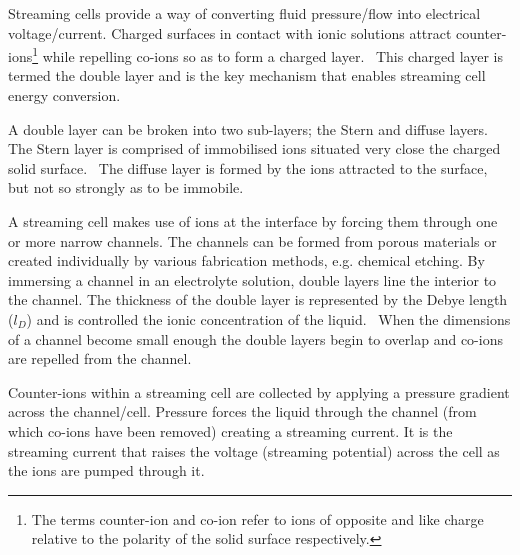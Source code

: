 \documentclass[10pt,final,journal]{IEEEtran}
\begin{document}
    Streaming cells provide a way of converting fluid pressure/flow into electrical voltage/current.
    Charged surfaces in contact with ionic solutions attract counter-ions\footnote{The terms counter-ion and co-ion refer to ions of opposite and like charge relative to the polarity of the solid surface respectively.} while repelling co-ions so as to form a charged layer.~\cite{Stein2004}
    This charged layer is termed the double layer and is the key mechanism that enables streaming cell energy conversion.

    A double layer can be broken into two sub-layers; the Stern and diffuse layers.
    The Stern layer is comprised of immobilised ions situated very close the charged solid surface.~\cite{Salieb-Beugelaar2009}
    The diffuse layer is formed by the ions attracted to the surface, but not so strongly as to be immobile.

    A streaming cell makes use of ions at the interface by forcing them through one or more narrow channels.
    The channels can be formed from porous materials or created individually by various fabrication methods, e.g. chemical etching.
    By immersing a channel in an electrolyte solution, double layers line the interior to the channel.
    The thickness of the double layer is represented by the Debye length ($l_{D}$) and is controlled the ionic concentration of the liquid.~\cite{Israelachvili2011}
    When the dimensions of a channel become small enough the double layers begin to overlap and co-ions are repelled from the channel.

    Counter-ions within a streaming cell are collected by applying a pressure gradient across the channel/cell.
    Pressure forces the liquid through the channel (from which co-ions have been removed) creating a streaming current.
    It is the streaming current that raises the voltage (streaming potential) across the cell as the ions are pumped through it.
\end{document}

